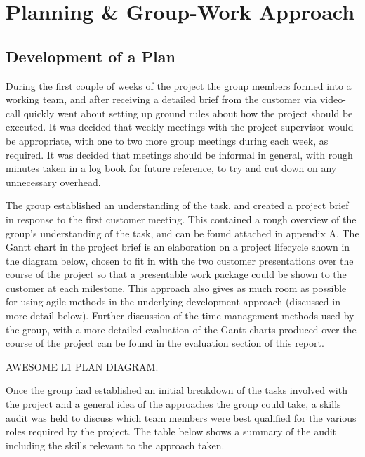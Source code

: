 \section{Planning \& Group-Work Approach}

\subsection{Development of a Plan}

During the first couple of weeks of the project the group members formed into a
working team,
and after receiving a detailed brief from the customer via video-call quickly
went about setting up ground rules about how the project should be executed. It
was decided that weekly meetings with the project supervisor would be
appropriate, with one to two more group meetings during each week, as required.
It was decided that meetings should be informal in general, with rough minutes
taken in a log book for future reference, to try and cut down on any unnecessary
 overhead.

The group established an understanding of the task, and created a project
brief in response to the first customer meeting. This contained a rough overview
of the group's understanding of the task, and can be found attached in appendix
A. The Gantt chart in the project brief is an elaboration on a project lifecycle
shown in the diagram below, chosen to fit in with the two customer
presentations over the course of the project so that a presentable work package
could be shown to the customer at each milestone. This approach also gives as
much room as possible
for using agile methods in the underlying development approach (discussed in
more detail below). Further discussion of the time management
methods used by the group, with a more detailed evaluation of the Gantt charts
produced over the course of the project can be found in the evaluation section
of this report.

AWESOME L1 PLAN DIAGRAM.

Once the group had established an initial breakdown of the tasks involved with the
project and a general idea of the approaches the group could take,
 a skills audit was held to discuss which team members were best
qualified for the various roles required by the project. The table below shows
a summary of the audit including the skills relevant to the approach taken.

